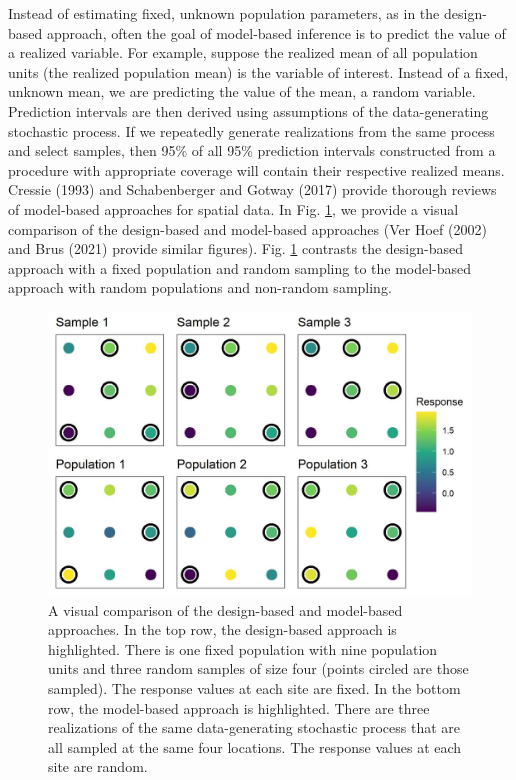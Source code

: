 \documentclass[]{elsarticle} %
\begin{document}
Instead of estimating fixed, unknown population parameters, as in the
design-based approach, often the goal of model-based inference is to
predict the value of a realized variable. For example, suppose the
realized mean of all population units (the realized population mean) is
the variable of interest. Instead of a fixed, unknown mean, we are
predicting the value of the mean, a random variable. Prediction
intervals are then derived using assumptions of the data-generating
stochastic process. If we repeatedly generate realizations from the same
process and select samples, then 95\% of all 95\% prediction intervals
constructed from a procedure with appropriate coverage will contain
their respective realized means. Cressie (1993) and Schabenberger and
Gotway (2017) provide thorough reviews of model-based approaches for
spatial data. In Fig. \ref{fig:fig1}, we provide a visual comparison of
the design-based and model-based approaches (Ver Hoef (2002) and Brus
(2021) provide similar figures). Fig. \ref{fig:fig1} contrasts the
design-based approach with a fixed population and random sampling to the
model-based approach with random populations and non-random sampling.

\begin{figure}
  \centering
  \includegraphics[width = 1\linewidth]{figures/dvm_comp.jpeg}
  \caption{A visual comparison of the design-based and model-based approaches. In the top row, the design-based approach is highlighted. There is one fixed population with nine population units and three random samples of size four (points circled are those sampled). The response values at each site are fixed. In the bottom row, the model-based approach is highlighted. There are three realizations of the same data-generating stochastic process that are all sampled at the same four locations. The response values at each site are random.}
  \label{fig:fig1}
\end{figure}
\end{document}
